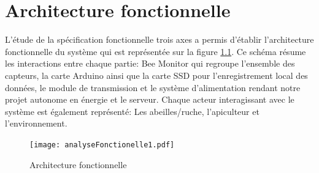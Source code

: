 \chapter{Architecture fonctionnelle}

L'étude de la spécification fonctionnelle trois axes a permis d'établir l'architecture fonctionnelle du système qui est représentée sur la figure \ref{fig:anaFonc}.
Ce schéma résume les interactions entre chaque partie: Bee Monitor qui regroupe l'ensemble des capteurs, la carte Arduino ainsi que la carte SSD pour l'enregistrement local des données, le module de transmission et le système d'alimentation rendant notre projet autonome en énergie et le serveur. Chaque acteur interagissant avec le système est également représenté: Les abeilles/ruche, l'apiculteur et l'environnement.   
  

\begin{figure}[h]
\centering\texttt{[image: analyseFonctionelle1.pdf]}
\caption{\label{fig:anaFonc} Architecture fonctionnelle}
\end{figure}    

